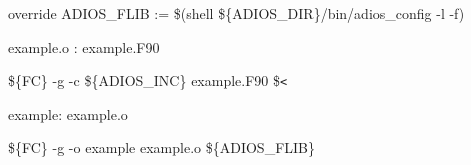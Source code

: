 \vspace{10pt}
override ADIOS\_FLIB := \$(shell \$\{ADIOS\_DIR\}/bin/adios\_config -l -f)

\vspace{22pt}
example.o : example.F90

\vspace{10pt}
\parindent=28pt
\$\{FC\} -g -c \$\{ADIOS\_INC\} example.F90  \$\texttt{<}

\vspace{22pt}
\parindent=0pt
example: example.o

\vspace{10pt}
\parindent=28pt
\$\{FC\} -g -o example example.o \$\{ADIOS\_FLIB\} \label{HToc84890232}\label{HToc212016607}\label{HToc212016849}\label{HToc82067514}\label{HToc182553347}
